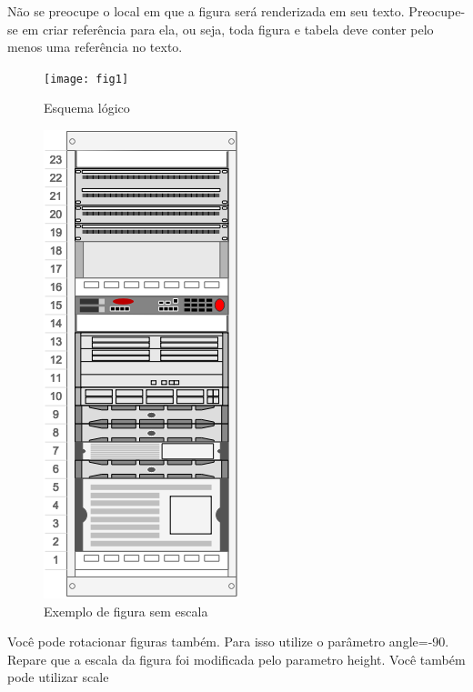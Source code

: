 \documentclass[	DIV=calc,%
							paper=a4,%
							fontsize=12pt,%
							onecolumn]{scrartcl}	 					%
\begin{document}
Não se preocupe o local em que a figura será renderizada em seu texto. Preocupe-se em criar referência para ela, ou seja, toda figura e tabela deve conter pelo menos uma referência no texto.

\begin{figure}
\centering
\texttt{[image: fig1]}
\caption{Esquema lógico}
\label{fig1}
\end{figure}


\begin{figure}
	\centering
	\includegraphics[]{fig2}
	\caption{Exemplo de figura sem escala}
	\label{fig2}
\end{figure}

Você pode rotacionar figuras também. Para isso utilize o parâmetro angle=-90. Repare que a escala da figura foi modificada pelo parametro height. Você também pode utilizar scale
\end{document}

